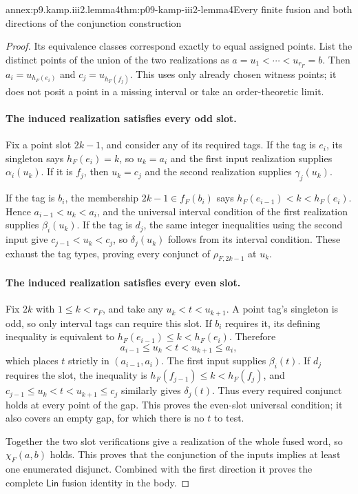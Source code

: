 \begin{annexitem}{annex:p9.kamp.iii2.lemma4}{thm:p09-kamp-iii2-lemma4}{Every finite fusion and both directions of the conjunction construction}
\begin{proof}
Its equivalence classes correspond exactly to equal assigned points.
List the distinct points of the union of the two realizations as
\(a=u_1<\cdots<u_{r_F}=b\). Then
\(a_i=u_{h_F(e_i)}\) and \(c_j=u_{h_F(f_j)}\).
This uses only already chosen witness points; it does not posit a
point in a missing interval or take an order-theoretic limit.

\paragraph{The induced realization satisfies every odd slot.}
Fix a point slot \(2k-1\), and consider any of its required tags.
If the tag is \(e_i\), its singleton says \(h_F(e_i)=k\), so
\(u_k=a_i\) and the first input realization supplies
\(\alpha_i(u_k)\). If it is \(f_j\), then \(u_k=c_j\) and
the second realization supplies \(\gamma_j(u_k)\).

If the tag is \(b_i\), the membership
\(2k-1\in f_F(b_i)\) says
\(h_F(e_{i-1})<k<h_F(e_i)\). Hence
\(a_{i-1}<u_k<a_i\), and the universal interval condition of
the first realization supplies \(\beta_i(u_k)\).
If the tag is \(d_j\), the same integer inequalities using the
second input give \(c_{j-1}<u_k<c_j\), so
\(\delta_j(u_k)\) follows from its interval condition.
These exhaust the tag types, proving every conjunct of
\(\rho_{F,2k-1}\) at \(u_k\).

\paragraph{The induced realization satisfies every even slot.}
Fix \(2k\) with \(1\leq k<r_F\), and take any
\(u_k<t<u_{k+1}\). A point tag's singleton is odd, so only interval
tags can require this slot. If \(b_i\) requires it, its defining
inequality is equivalent to
\(h_F(e_{i-1})\leq k<h_F(e_i)\). Therefore
\[
 a_{i-1}\leq u_k<t<u_{k+1}\leq a_i,
\]
which places \(t\) strictly in \((a_{i-1},a_i)\). The first
input supplies \(\beta_i(t)\). If \(d_j\) requires the slot,
the inequality is \(h_F(f_{j-1})\leq k<h_F(f_j)\), and
\(c_{j-1}\leq u_k<t<u_{k+1}\leq c_j\) similarly gives
\(\delta_j(t)\). Thus every required conjunct holds at every point
of the gap. This proves the even-slot universal condition; it also
covers an empty gap, for which there is no \(t\) to test.

Together the two slot verifications give a realization of the whole
fused word, so \(\chi_F(a,b)\) holds. This proves that the
conjunction of the inputs implies at least one enumerated disjunct.
Combined with the first direction it proves the complete
\(\mathsf{Lin}\) fusion identity in the body.


\end{proof}
\end{annexitem}
